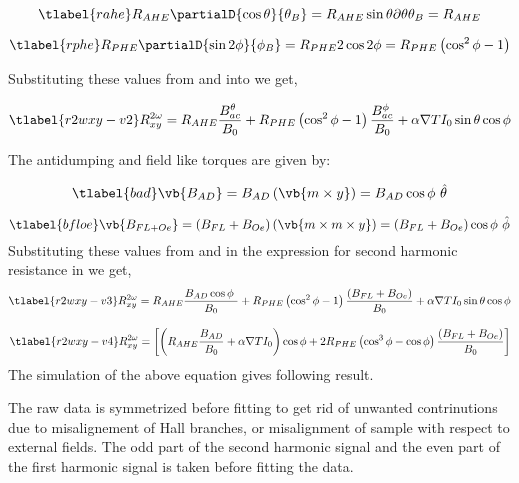 \begin{equation}
    \tlabel{rahe}
    R_{AHE} \partialD{\cos{\theta}} {\theta_B} = R_{AHE} \sin{\theta} \partial{\theta}{\theta_{B}} = R_{AHE} \\
    \end{equation}

\begin{equation}
    \tlabel{rphe}
    R_{PHE} \partialD{\sin{2\phi}}{\phi_B} = R_{PHE} 2 \cos{2 \phi} =
    R_{PHE} \left( \cos^{2}{\phi} - 1 \right) 
\end{equation}

Substituting these values from  and  into  
we get,

\begin{equation}
    \tlabel{r2wxy-v2}
    R^{2 \omega}_{xy}  = R_{AHE} \frac{B^{\theta}_{ac}}{B_{0}} 
    + R_{PHE} \left( \cos^{2}{\phi} - 1 \right) \frac{B^{\phi}_{ac}}{B_{0}}
    + \alpha \nabla {T} I_{0} \sin{\theta} \cos{\phi}
\end{equation}

The antidumping and field like torques are given by:

\begin{equation}
    \tlabel{bad}
    \vb{B_{AD}} = B_{AD} \left( \vb{m \times y} \right)
    = B_{AD} \cos{\phi}\ \hat{\theta}
\end{equation}

\begin{equation}
    \tlabel{bfloe}
    \vb{B_{FL+Oe}} = \left( B_{FL} + B_{Oe} \right) \left( \vb{m \times m \times y} \right)
    = \left( B_{FL} + B_{Oe} \right) \cos {\phi}\ \hat{\phi}
\end{equation}
Substituting these values from  and  in the expression 
for second harmonic resistance in  we get,
\begin{equation}
    \tlabel{r2wxy-v3}
    R^{2 \omega}_{xy}  = R_{AHE} \frac{B_{AD} \cos{\phi}\ }{B_{0}} 
    + R_{PHE} \left( \cos^{2}{\phi} - 1 \right) \frac{ \left( B_{FL} + B_{Oe} \right) }{B_{0}}
    + \alpha \nabla {T} I_{0} \sin{\theta} \cos{\phi}
\end{equation}

\begin{equation}
    \tlabel{r2wxy-v4}
    R^{2 \omega}_{xy}  = \left[ \left( R_{AHE} \frac{B_{AD}}{B_{0}} + 
    \alpha \nabla {T} I_{0} \right) \cos{\phi} \\
    + 2 R_{PHE} \left( \cos^{3}{\phi} - \cos{\phi} \right) 
    \frac{ \left( B_{FL} + B_{Oe} \right) }{B_{0}}  \right]    
\end{equation}
The simulation of the above equation gives following result.

The raw data is symmetrized before fitting to get rid of unwanted contrinutions 
due to misalignement of Hall branches, or misalignment of sample with respect 
to external fields. The odd part of the second harmonic signal and the even
part of the first harmonic signal is taken before fitting the data.
